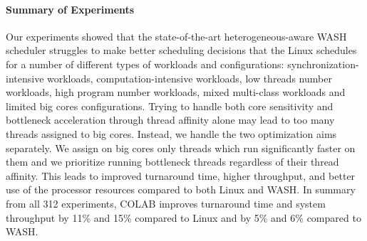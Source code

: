 \paragraph{Summary of Experiments} Our experiments showed that the state-of-the-art heterogeneous-aware WASH scheduler struggles to make better scheduling decisions that the Linux schedules for a number of different types of workloads and configurations: synchronization-intensive workloads, computation-intensive workloads, low threads number workloads, high program number workloads, mixed multi-class workloads and limited big cores configurations. Trying to handle both core sensitivity and bottleneck acceleration through thread affinity alone may lead to too many threads assigned to big cores. Instead, we handle the two optimization aims separately. We assign on big cores only threads which run significantly faster on them and we prioritize running bottleneck threads regardless of their thread affinity. This leads to improved turnaround time, higher throughput, and better use of the processor resources compared to both Linux and WASH. In summary from all 312 experiments, COLAB improves turnaround time and system throughput by 11\% and 15\% compared to Linux and by 5\% and 6\% compared to WASH.



